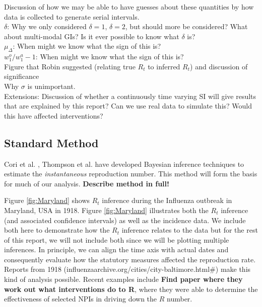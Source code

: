 \documentclass[10pt,journal,compsoc]{IEEEtran}
\begin{document}
Discussion of how we may be able to have guesses about these quantities by how data is collected to generate serial intervals.\\

$\delta$: Why we only considered $\delta=1$, $\delta=2$, but should more be considered? What about multi-modal GIs? Is it ever possible to know what $\delta$ is? \\

$\mu_{\Delta}$: When might we know what the sign of this is?\\

$w_1^o/w_1^a -1$: When might we know what the sign of this is?\\

Figure that Robin suggested (relating true $R_t$ to inferred $R_t$) and discussion of significance\\

Why $\sigma$ is unimportant.\\

Extensions: Discussion of whether a continuously time varying SI will give results that are explained by this report? Can we use real data to simulate this? Would this have affected interventions?\\


 

 
 \subsection{Standard Method}
 
 Cori et al. \cite{Cori-Ferguson}, Thompson et al. \cite{Thompson-Stockwin} have developed Bayesian inference techniques to estimate the \textit{instantaneous} reproduction number. This method will form the basis for much of our analysis. \textbf{Describe method in full!}
 
 Figure \ref{fig:Maryland} shows $R_t$ inference during the Influenza outbreak in Maryland, USA in 1918. Figure \ref{fig:Maryland} illustrates both the $R_t$ inference (and associated confidence intervals) as well as the incidence data. We include both here to demonstrate how the $R_t$ inference relates to the data but for the rest of this report, we will not include both since we will be plotting multiple inferences. In principle, we can align the time axis with actual dates and consequently evaluate how the statutory measures affected the reproduction rate. Reports from 1918 (influenzaarchive.org/cities/city-baltimore.html#) make this kind of analysis possible. Recent examples include \textbf{Find paper where they work out what interventions do to R}, where they were able to determine the effectiveness of selected NPIs in driving down the $R$ number.\\
 
\end{document}
